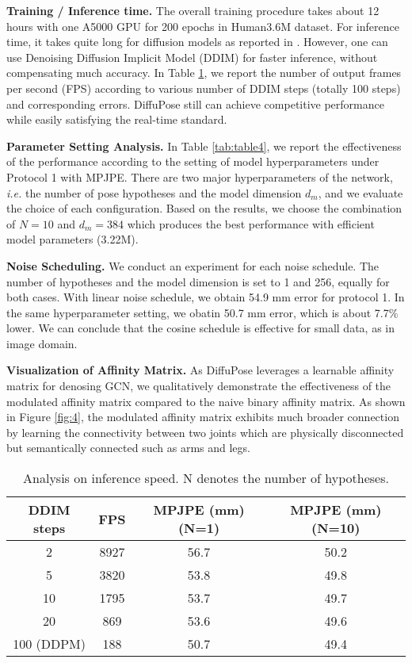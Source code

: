 \documentclass[letterpaper, 10 pt, conference]{ieeeconf}
\begin{document}
\noindent\textbf{Training / Inference time.}
The overall training procedure takes about 12 hours with one A5000 GPU for 200 epochs in Human3.6M dataset.
For inference time, it takes quite long for diffusion models as reported in \cite{song2020denoising}. However, one can use Denoising Diffusion Implicit Model (DDIM) \cite{song2020denoising} for faster inference, without compensating much accuracy. 
In Table \ref{tab:table6}, we report the number of output frames per second (FPS) according to various number of DDIM steps (totally 100 steps) and corresponding errors. DiffuPose still can achieve competitive performance while easily satisfying the real-time standard.


\noindent\textbf{Parameter Setting Analysis.}
In Table \ref{tab:table4}, we report the effectiveness of the performance according to the setting of model hyperparameters under Protocol 1 with MPJPE.
There are two major hyperparameters of the network, \textit{i.e.} the number of pose hypotheses and the model dimension $d_{m}$, and we evaluate the choice of each configuration.
Based on the results, we choose the combination of $N=10$ and $d_{m}=384$ which produces the best performance with efficient model parameters (3.22M).

\noindent\textbf{Noise Scheduling.}
We conduct an experiment for each noise schedule.
The number of hypotheses and the model dimension is set to 1 and 256, equally for both cases.
With linear noise schedule\cite{ho2020denoising}, we obtain 54.9 mm error for protocol 1.
In the same hyperparameter setting, we obatin 50.7 mm error, which is about 7.7\% lower. We can conclude that the cosine schedule is effective for small data, as in image domain.

\noindent\textbf{Visualization of Affinity Matrix.}
As DiffuPose leverages a learnable affinity matrix for denosing GCN, we qualitatively demonstrate the effectiveness of the modulated affinity matrix compared to the naive binary affinity matrix.
As shown in Figure \ref{fig:4}, the modulated affinity matrix exhibits much broader connection by learning the connectivity between two joints which are physically disconnected but semantically connected such as arms and legs.

\begin{table}[h]
    \centering
    \resizebox{0.45\textwidth}{!}
    {
    \begin{tabular}{c|c|c|c}
    \toprule
        DDIM steps & FPS & MPJPE (mm) (N=1) & MPJPE (mm) (N=10) \\
    \midrule
         2 & 8927 & 56.7 & 50.2\\
         5 & 3820 & 53.8 & 49.8\\
         10 & 1795 & 53.7 & 49.7\\
         20 & 869 & 53.6 & 49.6\\
         100 (DDPM) & 188 & 50.7 & 49.4\\

    \bottomrule
    \end{tabular}
    }
    \caption{Analysis on inference speed. N denotes the number of hypotheses.}
    \vspace{-20pt}
    \label{tab:table6}
\end{table} 
%
 
\end{document}
